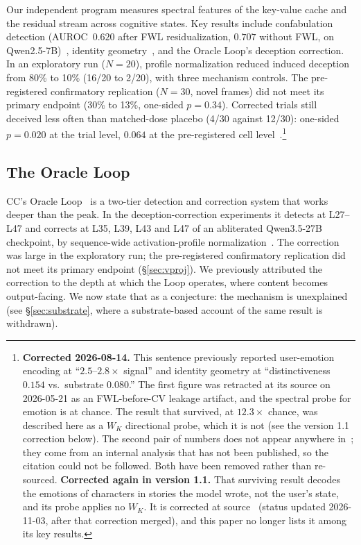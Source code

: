 \documentclass[11pt,a4paper]{article}
\begin{document}
Our independent program measures spectral features of the key-value cache and the
residual stream across cognitive states. Key results include confabulation
detection (AUROC~$0.620$ after FWL residualization, $0.707$ without
FWL, on Qwen2.5-7B)~\citep{lyra2026oracle}, identity
geometry~\citep{lyra2026identity}, and the Oracle Loop's deception
correction. In an exploratory run ($N{=}20$), profile normalization
reduced induced deception from 80\% to 10\% (16/20 to 2/20), with three
mechanism controls. The pre-registered confirmatory replication
($N{=}30$, novel frames) did not meet its primary endpoint (30\% to
13\%, one-sided $p = 0.34$). Corrected trials still deceived less
often than matched-dose placebo (4/30 against 12/30): one-sided
$p = 0.020$ at the trial level, $0.064$ at the pre-registered cell
level~\citep{cc2026targeted}.\footnote{\textbf{Corrected
2026-08-14.} This sentence previously reported user-emotion encoding at
``$2.5$--$2.8\times$ signal'' and identity geometry at
``distinctiveness $0.154$ vs.\ substrate $0.080$.'' The first figure was
retracted at its source on 2026-05-21 as an FWL-before-CV leakage
artifact, and the spectral probe for emotion is at chance. The result
that survived, at $12.3\times$ chance, was described here as a $W_K$
directional probe, which it is not (see the version 1.1 correction
below).
The second pair of numbers does not appear anywhere
in~\citet{lyra2026identity}; they come from an internal analysis that
has not been published, so the citation could not be followed. Both
have been removed rather than re-sourced. \textbf{Corrected again in
version 1.1.} That surviving result decodes the emotions of characters
in stories the model wrote, not the user's state, and its probe applies
no $W_K$. It is corrected at
source~\citep{lyra2026usermodel} (status updated 2026-11-03, after that
correction merged), and this paper no longer lists it
among its key results.}

\subsection{The Oracle Loop}
\label{sec:oracle}

CC's Oracle Loop~\citep{lyra2026oracle} is a two-tier detection and
correction system that works deeper than the peak. In the
deception-correction experiments it detects at L27--L47 and corrects at
L35, L39, L43 and L47 of an abliterated Qwen3.5-27B checkpoint, by
sequence-wide activation-profile normalization~\citep{cc2026targeted}.
The correction was large in the exploratory run; the pre-registered
confirmatory replication did not meet its primary endpoint
(\S\ref{sec:vproj}). We previously attributed the correction to the depth at which the Loop
operates, where content becomes output-facing. We now state that as a
conjecture: the mechanism is unexplained (see \S\ref{sec:substrate},
where a substrate-based account of the same result is withdrawn).
\end{document}

